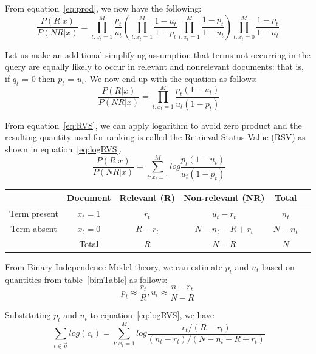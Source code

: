 From equation~\ref{eq:prod}, we now have the following:
\begin{equation}
\frac{P(R|x)}{P(NR|x)} = \prod_{t:x_t=1}^M\frac{p_t}{u_t} (\prod_{t:x_t=1}^M\frac{1-u_t}{1-p_t}\prod_{t:x_t=1}^M\frac{1-p_t}{1-u_t})
  \prod_{t:x_t=0}^M\frac{1-p_t}{1-u_t}
\end{equation}

Let us make an additional simplifying assumption that terms not occurring in the query are equally likely to occur in relevant and nonrelevant documents: 
that is, if $q_t$ = 0 then $p_t$ = $u_t$. We now end up with the equation as follows:
\begin{equation}~\label{eq:RVS}
\frac{P(R|x)}{P(NR|x)} = \prod_{t:x_t=1}^M\frac{p_t(1-u_t)}{u_t(1-p_t)}
\end{equation}

From equation~\ref{eq:RVS}, we can apply logarithm to avoid zero product and the resulting quantity used for ranking is
called the Retrieval Status Value (RSV) as shown in equation~\ref{eq:logRVS}.
\begin{equation}~\label{eq:logRVS}
\frac{P(R|x)}{P(NR|x)} = \sum_{t:x_t=1}^M log \frac{p_t(1-u_t)}{u_t(1-p_t)}
\end{equation}

\begin{table}
 \centering
\begin{tabular}{|cc|c|c|c|c|}
\hline  & \textbf{Document} & \textbf{Relevant (R)} & \textbf{Non-relevant (NR)} & \textbf{Total} \\
\hline Term present & $x_t = 1$ & $r_t$ & $u_t - r_t$ & $n_t$\\
 Term absent & $x_t = 0$ & $R - r_t$ & $N - n_t - R + r_t$ & $N - n_t$ \\ 
\hline & Total & $R$ & $N - R$ & $N$ \\
\hline
\end{tabular}
\label{table:bimTable}
\end{table}

From Binary Independence Model theory, we can estimate $p_t$ and $u_t$ based on quantities from table~\ref{bimTable} as follows:
\[
 p_t \approx \frac{r_t}{R},  u_t \approx \frac{n - r_t}{N - R}
\]

Substituting $p_t$ and $u_t$ to equation~\ref{eq:logRVS}, we have
\begin{equation}~\label{eq:newlogRVS}
\sum_{t \in \vec{q}} log(c_t) = \sum_{t:x_t=1}^M log \frac{r_t/(R - r_t)}{(n_t - r_t)/(N - n_t - R + r_t)}
\end{equation}

